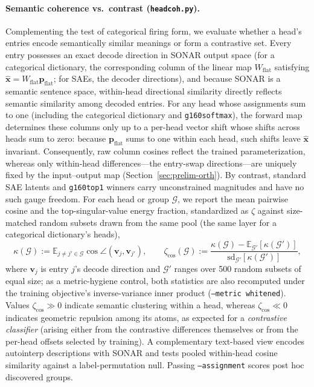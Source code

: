 \paragraph{Semantic coherence vs.\ contrast (\texttt{headcoh.py}).}
Complementing the test of categorical firing form, we evaluate whether a
head's entries encode semantically similar meanings or form a contrastive
set. Every entry possesses an exact decode direction in SONAR output space
(for a categorical dictionary, the corresponding column of the linear map
$W_{\mathrm{flat}}$ satisfying
$\hat{\mathbf{x}} = W_{\mathrm{flat}}\mathbf{p}_{\mathrm{flat}}$; for SAEs,
the decoder directions), and because SONAR is a semantic sentence space,
within-head directional similarity directly reflects semantic similarity
among decoded entries. For any head whose assignments sum to one (including
the categorical dictionary and \texttt{g160softmax}), the forward map
determines these columns only up to a per-head vector shift whose shifts
across heads sum to
zero: because $\mathbf{p}_{\mathrm{flat}}$ sums to one within each head,
such shifts leave $\hat{\mathbf{x}}$ invariant. Consequently, raw column
cosines reflect the trained parameterization, whereas only within-head
differences---the entry-swap directions---are uniquely fixed by the input--output
map (Section~\ref{sec:prelim-orth}). By contrast, standard SAE latents and
\texttt{g160top1} winners carry unconstrained magnitudes and have no such
gauge freedom. For each head or group $\mathcal{G}$, we report the mean
pairwise cosine and the top-singular-value energy fraction, standardized as
$\zeta$ against size-matched random subsets drawn from the same pool (the
same layer for a categorical dictionary's heads),
\begin{equation}
	\kappa(\mathcal{G}) := \mathbb{E}_{j \neq j' \in \mathcal{G}}\cos\angle(\mathbf{v}_j, \mathbf{v}_{j'}),
	\qquad
	\zeta_{\cos}(\mathcal{G}) := \frac{\kappa(\mathcal{G}) - \mathbb{E}_{\mathcal{G}'}[\kappa(\mathcal{G}')]}{\mathrm{sd}_{\mathcal{G}'}[\kappa(\mathcal{G}')]},
	\label{eq:zcos}
\end{equation}
where $\mathbf{v}_j$ is entry $j$'s decode direction and $\mathcal{G}'$
ranges over 500 random subsets of equal size; as a metric-hygiene control,
both statistics are also recomputed under the training objective's
inverse-variance inner product (\texttt{--metric whitened}). Values
$\zeta_{\cos} \gg 0$ indicate semantic clustering within a head, whereas
$\zeta_{\cos} \ll 0$ indicates geometric repulsion among its atoms, as
expected for a \emph{contrastive classifier} (arising either from the
contrastive differences themselves or from the per-head offsets selected by
training). A complementary text-based view encodes autointerp descriptions
with SONAR and tests pooled within-head cosine similarity against a
label-permutation null. Passing \texttt{--assignment} scores post hoc discovered
groups.

